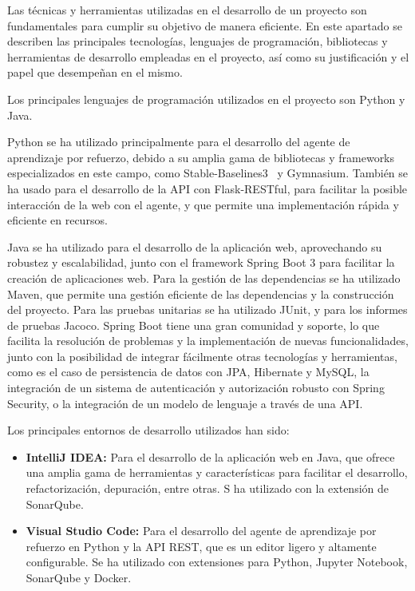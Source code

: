 Las técnicas y herramientas utilizadas en el desarrollo de un proyecto son fundamentales para cumplir su objetivo de manera eficiente. En este apartado se describen las principales tecnologías, lenguajes de programación, bibliotecas y herramientas de desarrollo empleadas en el proyecto, así como su justificación y el papel que desempeñan en el mismo.

Los principales lenguajes de programación utilizados en el proyecto son Python y Java.

Python se ha utilizado principalmente para el desarrollo del agente de aprendizaje por refuerzo, debido a su amplia gama de bibliotecas y frameworks especializados en este campo, como Stable-Baselines3~\cite{Raffin2021} y Gymnasium. También se ha usado para el desarrollo de la API con Flask-RESTful, para facilitar la posible interacción de la web con el agente, y que permite una implementación rápida y eficiente en recursos.

Java se ha utilizado para el desarrollo de la aplicación web, aprovechando su robustez y escalabilidad, junto con el framework Spring Boot 3 para facilitar la creación de aplicaciones web. Para la gestión de las dependencias se ha utilizado Maven, que permite una gestión eficiente de las dependencias y la construcción del proyecto. Para las pruebas unitarias se ha utilizado JUnit, y para los informes de pruebas Jacoco. Spring Boot tiene una gran comunidad y soporte, lo que facilita la resolución de problemas y la implementación de nuevas funcionalidades, junto con la posibilidad de integrar fácilmente otras tecnologías y herramientas, como es el caso de persistencia de datos con JPA, Hibernate y MySQL, la integración de un sistema de autenticación y autorización robusto con Spring Security, o la integración de un modelo de lenguaje a través de una API.

Los principales entornos de desarrollo utilizados han sido:
\begin{itemize}
    \item \textbf{IntelliJ IDEA:} Para el desarrollo de la aplicación web en Java, que ofrece una amplia gama de herramientas y características para facilitar el desarrollo, refactorización, depuración, entre otras. S ha utilizado con la extensión de SonarQube.
    \item \textbf{Visual Studio Code:} Para el desarrollo del agente de aprendizaje por refuerzo en Python y la API REST, que es un editor ligero y altamente configurable. Se ha utilizado con extensiones para Python, Jupyter Notebook, SonarQube y Docker.
\end{itemize}

